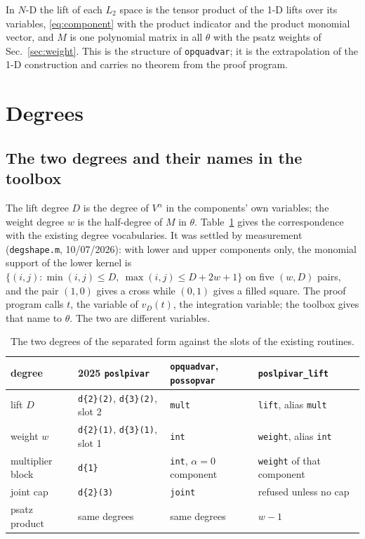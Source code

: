 \documentclass[12pt]{article}
\newcommand{\code}[1]{\texttt{#1}}
\theoremstyle{plain}
\theoremstyle{definition}
\theoremstyle{remark}
\begin{document}
In $N$-D the lift of each $L_2$ space is the tensor product of the 1-D lifts over its variables, \eqref{eq:component} with the product indicator and the product monomial vector, and $M$ is one polynomial matrix in all $\theta$ with the psatz weights of Sec.~\ref{sec:weight}. This is the structure of \code{opquadvar}; it is the extrapolation of the 1-D construction and carries no theorem from the proof program.

\section{Degrees}\label{sec:degrees}

\subsection{The two degrees and their names in the toolbox}

The lift degree $D$ is the degree of $V^\alpha$ in the components' own variables; the weight degree $w$ is the half-degree of $M$ in $\theta$. Table~\ref{tab:slots} gives the correspondence with the existing degree vocabularies. It was settled by measurement (\code{degshape.m}, 10/07/2026): with lower and upper components only, the monomial support of the lower kernel is $\{(i,j):\min(i,j)\le D,\ \max(i,j)\le D+2w+1\}$ on five $(w,D)$ pairs, and the pair $(1,0)$ gives a cross while $(0,1)$ gives a filled square. The proof program calls $t$, the variable of $v_D(t)$, the integration variable; the toolbox gives that name to $\theta$. The two are different variables.

\begin{table}[h]\centering\footnotesize
\setlength{\tabcolsep}{5pt}
\begin{tabular}{llll}
\toprule
degree & 2025 \code{poslpivar} & \code{opquadvar}, \code{possopvar} & \code{poslpivar\_lift} \\
\midrule
lift $D$ & \code{d\{2\}(2)}, \code{d\{3\}(2)}, slot 2 & \code{mult} & \code{lift}, alias \code{mult} \\
weight $w$ & \code{d\{2\}(1)}, \code{d\{3\}(1)}, slot 1 & \code{int} & \code{weight}, alias \code{int} \\
multiplier block & \code{d\{1\}} & \code{int}, $\alpha=0$ component & \code{weight} of that component \\
joint cap & \code{d\{2\}(3)} & \code{joint} & refused unless no cap \\
psatz product & same degrees & same degrees & $w-1$ \\
\bottomrule
\end{tabular}
\caption{The two degrees of the separated form against the slots of the existing routines.}\label{tab:slots}
\end{table}
\end{document}
